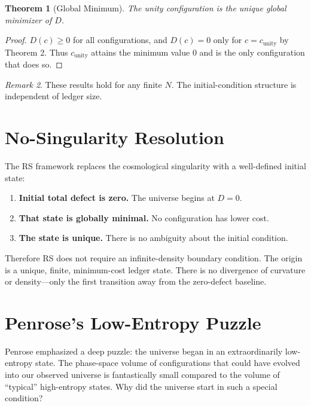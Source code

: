 \documentclass[12pt,a4paper]{article}
\newtheorem{theorem}{Theorem}[section]
\theoremstyle{definition}
\theoremstyle{remark}
\newtheorem{remark}[theorem]{Remark}
\begin{document}
\begin{theorem}[Global Minimum]
The unity configuration is the unique global minimizer of $D$.
\end{theorem}

\begin{proof}
$D(c) \geq 0$ for all configurations, and $D(c) = 0$ only for $c = c_{\mathrm{unity}}$
by Theorem 2.
Thus $c_{\mathrm{unity}}$ attains the minimum value 0 and is the only configuration
that does so.
\end{proof}

\begin{remark}
These results hold for any finite $N$.
The initial-condition structure is independent of ledger size.
\end{remark}

\section{No-Singularity Resolution}

The RS framework replaces the cosmological singularity with a well-defined
initial state:

\begin{enumerate}[label=(\roman*)]
\item \textbf{Initial total defect is zero.} The universe begins at $D = 0$.
\item \textbf{That state is globally minimal.} No configuration has lower cost.
\item \textbf{The state is unique.} There is no ambiguity about the initial condition.
\end{enumerate}

Therefore RS does not require an infinite-density boundary condition.
The origin is a unique, finite, minimum-cost ledger state.
There is no divergence of curvature or density---only the first transition
away from the zero-defect baseline.

\section{Penrose's Low-Entropy Puzzle}

Penrose \cite{penrose1979singularities,penrose1989emperor} emphasized a deep
puzzle: the universe began in an extraordinarily low-entropy state.
The phase-space volume of configurations that could have evolved into our
observed universe is fantastically small compared to the volume of
``typical'' high-entropy states.
Why did the universe start in such a special condition?
\end{document}
